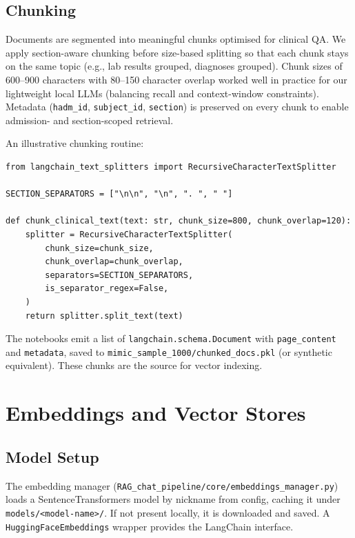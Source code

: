 \subsection{Chunking}
Documents are segmented into meaningful chunks optimised for clinical QA. We apply section-aware chunking before size-based splitting so that each chunk stays on the same topic (e.g., lab results grouped, diagnoses grouped). Chunk sizes of 600--900 characters with 80--150 character overlap worked well in practice for our lightweight local LLMs (balancing recall and context-window constraints). Metadata (\texttt{hadm\_id}, \texttt{subject\_id}, \texttt{section}) is preserved on every chunk to enable admission- and section-scoped retrieval.

\vspace{0.5em}
\noindent An illustrative chunking routine:
\begin{verbatim}
from langchain_text_splitters import RecursiveCharacterTextSplitter

SECTION_SEPARATORS = ["\n\n", "\n", ". ", " "]

def chunk_clinical_text(text: str, chunk_size=800, chunk_overlap=120):
    splitter = RecursiveCharacterTextSplitter(
        chunk_size=chunk_size,
        chunk_overlap=chunk_overlap,
        separators=SECTION_SEPARATORS,
        is_separator_regex=False,
    )
    return splitter.split_text(text)
\end{verbatim}

\noindent The notebooks emit a list of \texttt{langchain.schema.Document} with \texttt{page\_content} and \texttt{metadata}, saved to \texttt{mimic\_sample\_1000/chunked\_docs.pkl} (or synthetic equivalent). These chunks are the source for vector indexing.

\section{Embeddings and Vector Stores}

\subsection{Model Setup}
The embedding manager (\texttt{RAG\_chat\_pipeline/core/embeddings\_manager.py}) loads a SentenceTransformers model by nickname from config, caching it under \texttt{models/<model-name>/}. If not present locally, it is downloaded and saved. A \texttt{HuggingFaceEmbeddings} wrapper provides the LangChain interface.

